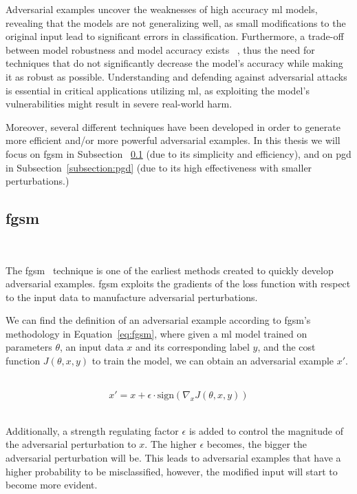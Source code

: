 Adversarial examples uncover the weaknesses of high accuracy \ac{ml} models,
revealing that the models are not generalizing well, as small modifications
to the original input lead to significant errors in classification.
Furthermore, a trade-off between model robustness and model accuracy exists
~\cite{tsipras_robustness_2019}, thus the need for techniques that do
not significantly decrease the model's accuracy while making it as
robust as possible. Understanding and defending against adversarial
attacks is essential in critical applications utilizing \ac{ml}, as
exploiting the model's vulnerabilities might result in severe
real-world harm. \

Moreover, several different techniques have been developed in order
to generate more efficient and/or more powerful adversarial examples.
In this thesis we will focus on \ac{fgsm} in Subsection
~\ref{subsection:fgsm} (due to its simplicity and efficiency), and on
\ac{pgd} in Subsection~\ref{subsection:pgd} (due to its high
effectiveness with smaller perturbations.) \

\subsection{\acl{fgsm}}\label{subsection:fgsm} \

The \ac{fgsm}~\cite{goodfellow_explaining_2015} technique is one
of the earliest methods created to quickly develop adversarial
examples. \ac{fgsm} exploits the gradients of the loss function
with respect to the input data to manufacture adversarial
perturbations. \

We can find the definition of an adversarial example according
to \ac{fgsm}'s methodology in Equation~\ref*{eq:fgsm}, where given
a \ac{ml} model trained on parameters \(\theta\), an input data \(x\)
and its corresponding label \(y\), and the cost function 
\( J(\theta, x, y) \) to train the model, we can obtain
an adversarial example \(x'\). \

\begin{equation}\label{eq:fgsm}
  x' = x + \epsilon \cdot \text{sign}(\nabla_x J(\theta, x, y))
\end{equation} \

Additionally, a strength regulating factor \(\epsilon\) is added
to control the magnitude of the adversarial perturbation to \(x\).
The higher \(\epsilon\) becomes, the bigger the adversarial
perturbation will be. This leads to adversarial examples that have
a higher probability to be misclassified, however, the modified
input will start to become more evident. \

